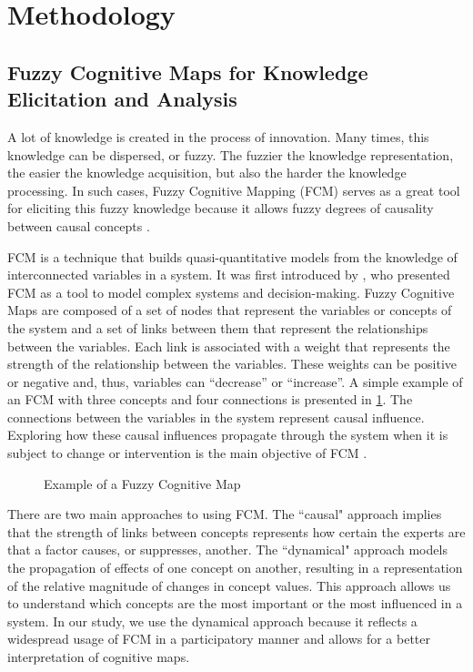 \section{Methodology}

\subsection{Fuzzy Cognitive Maps for Knowledge Elicitation and Analysis}

A lot of knowledge is created in the process of innovation. Many times, this knowledge can be dispersed, or fuzzy. The fuzzier the knowledge representation, the easier the knowledge acquisition, but also the harder the knowledge processing. In such cases, Fuzzy Cognitive Mapping (FCM) serves as a great tool for eliciting this fuzzy knowledge because it allows fuzzy degrees of causality between causal concepts \citep{kosko1986fuzzy}. 

FCM is a technique that builds quasi-quantitative models from the knowledge of interconnected variables in a system. It was first introduced by \cite{kosko1986fuzzy}, who presented FCM as a tool to model complex systems and decision-making. Fuzzy Cognitive Maps are composed of a set of nodes that represent the variables or concepts of the system and a set of links between them that represent the relationships between the variables. Each link is associated with a weight that represents the strength of the relationship between the variables. These weights can be positive or negative and, thus, variables can ``decrease'' or ``increase''. A simple example of an FCM with three concepts and four connections is presented in \cref{example_fcm}. The connections between the variables in the system represent causal influence. Exploring how these causal influences propagate through the system when it is subject to change or intervention is the main objective of FCM \citep{barbrook2022systems}.

\begin{figure}[H]
\caption{Example of a Fuzzy Cognitive Map}  
\label{example_fcm}
\centering

\end{figure}

There are two main approaches to using FCM. The ``causal" approach implies that the strength of links between concepts represents how certain the experts are that a factor causes, or suppresses, another. The ``dynamical" approach models the propagation of effects of one concept on another, resulting in a representation of the relative magnitude of changes in concept values. This approach allows us to understand which concepts are the most important or the most influenced in a system. In our study, we use the dynamical approach because it reflects a widespread usage of FCM in a participatory manner and allows for a better interpretation of cognitive maps.

